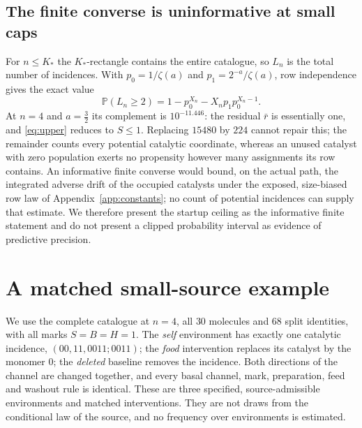 \documentclass[11pt,letterpaper]{article}
\theoremstyle{plain}
\theoremstyle{definition}
\theoremstyle{remark}
\numberwithin{equation}{section}
\newcommand{\PP}{\mathbb P}
\begin{document}
\subsection{The finite converse is uninformative at small caps}
For $n\le K_*$ the $K_*$-rectangle contains the entire catalogue, so $L_n$ is the total number of incidences. With $p_0=1/\zeta(a)$ and $p_1=2^{-a}/\zeta(a)$, row independence gives the exact value
\begin{equation}\label{eq:finiteobstruction}
 \PP(L_n\ge2)=1-p_0^{X_n}-X_np_1p_0^{X_n-1}.
\end{equation}
At $n=4$ and $a=\tfrac32$ its complement is $10^{-11.446}$: the residual $\bar r$ is essentially one, and \eqref{eq:upper} reduces to $S\le1$. Replacing $15480$ by $224$ cannot repair this; the remainder counts every potential catalytic coordinate, whereas an unused catalyst with zero population exerts no propensity however many assignments its row contains. An informative finite converse would bound, on the actual path, the integrated adverse drift of the occupied catalysts under the exposed, size-biased row law of Appendix~\ref{app:constants}; no count of potential incidences can supply that estimate. We therefore present the startup ceiling as the informative finite statement and do not present a clipped probability interval as evidence of predictive precision.

\section{A matched small-source example}\label{sec:example}

We use the complete catalogue at $n=4$, all $30$ molecules and $68$ split identities, with all marks $S=B=H=1$. The \emph{self} environment has exactly one catalytic incidence, $(00,11,0011;0011)$; the \emph{food} intervention replaces its catalyst by the monomer $0$; the \emph{deleted} baseline removes the incidence. Both directions of the channel are changed together, and every basal channel, mark, preparation, feed and washout rule is identical. These are three specified, source-admissible environments and matched interventions. They are not draws from the conditional law of the source, and no frequency over environments is estimated.
\end{document}
